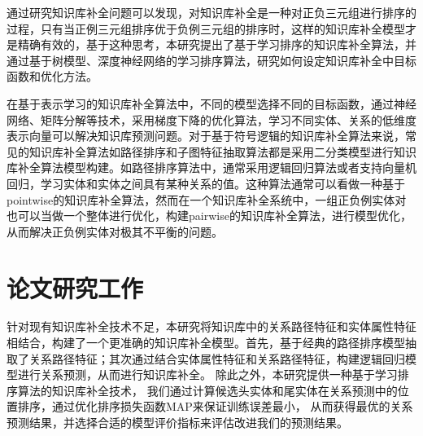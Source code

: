 通过研究知识库补全问题可以发现，对知识库补全是一种对正负三元组进行排序的过程，只有当正例三元组排序优于负例三元组的排序时，这样的知识库补全模型才是精确有效的，基于这种思考，本研究提出了基于学习排序的知识库补全算法，并通过基于树模型、深度神经网络的学习排序算法，研究如何设定知识库补全中目标函数和优化方法。

在基于表示学习的知识库补全算法中，不同的模型选择不同的目标函数，通过神经网络、矩阵分解等技术，采用梯度下降的优化算法，学习不同实体、关系的低维度表示向量可以解决知识库预测问题。对于基于符号逻辑的知识库补全算法来说，常见的知识库补全算法如路径排序和子图特征抽取算法都是采用二分类模型进行知识库补全算法模型构建。如路径排序算法中，通常采用逻辑回归算法或者支持向量机回归，学习实体和实体之间具有某种关系的值。这种算法通常可以看做一种基于pointwise的知识库补全算法，然而在一个知识库补全系统中，一组正负例实体对也可以当做一个整体进行优化，构建pairwise的知识库补全算法，进行模型优化，从而解决正负例实体对极其不平衡的问题。

\section{论文研究工作}

针对现有知识库补全技术不足，本研究将知识库中的关系路径特征和实体属性特征相结合，构建了一个更准确的知识库补全模型。首先，基于经典的路径排序模型抽取了关系路径特征；其次通过结合实体属性特征和关系路径特征，构建逻辑回归模型进行关系预测，从而进行知识库补全。
除此之外，本研究提供一种基于学习排序算法的知识库补全技术，
我们通过计算候选头实体和尾实体在关系预测中的位置排序，通过优化排序损失函数MAP来保证训练误差最小，
从而获得最优的关系预测结果，并选择合适的模型评价指标来评估改进我们的预测结果。

